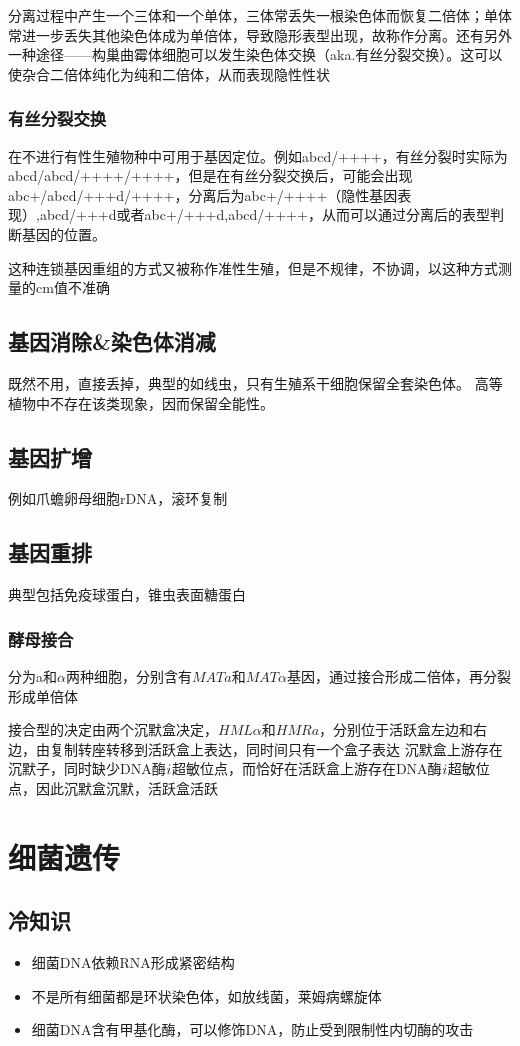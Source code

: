 \documentclass[a4paper, 12pt]{report}
\begin{document}
  分离过程中产生一个三体和一个单体，三体常丢失一根染色体而恢复二倍体；单体常进一步丢失其他染色体成为单倍体，导致隐形表型出现，故称作分离。还有另外一种途径——构巢曲霉体细胞可以发生染色体交换（aka.有丝分裂交换）。这可以使杂合二倍体纯化为纯和二倍体，从而表现隐性性状
  \subsection{有丝分裂交换}
  在不进行有性生殖物种中可用于基因定位。例如abcd/++++，有丝分裂时实际为abcd/abcd/++++/++++，但是在有丝分裂交换后，可能会出现abc+/abcd/+++d/++++，分离后为abc+/++++（隐性基因表现）,abcd/+++d或者abc+/+++d,abcd/++++，从而可以通过分离后的表型判断基因的位置。

  这种连锁基因重组的方式又被称作准性生殖，但是不规律，不协调，以这种方式测量的cm值不准确
  \section{基因消除\&染色体消减}
  既然不用，直接丢掉，典型的如线虫，只有生殖系干细胞保留全套染色体。
  高等植物中不存在该类现象，因而保留全能性。
  \section{基因扩增}
  例如爪蟾卵母细胞rDNA，滚环复制
  \section{基因重排}
  典型包括免疫球蛋白，锥虫表面糖蛋白
  \subsection{酵母接合}
  分为a和\(\alpha\)两种细胞，分别含有\(MATa\)和\(MAT\alpha\)基因，通过接合形成二倍体，再分裂形成单倍体
  
  接合型的决定由两个沉默盒决定，\(HML\alpha\)和\(HMRa\)，分别位于活跃盒左边和右边，由复制转座转移到活跃盒上表达，同时间只有一个盒子表达
  沉默盒上游存在沉默子，同时缺少DNA酶\(\romannumeral1\)超敏位点，而恰好在活跃盒上游存在DNA酶\(\romannumeral1\)超敏位点，因此沉默盒沉默，活跃盒活跃
  \chapter{细菌遗传}
  \section{冷知识}
  \begin{itemize}
    \item 细菌DNA依赖RNA形成紧密结构
    \item 不是所有细菌都是环状染色体，如放线菌，莱姆病螺旋体
    \item 细菌DNA含有甲基化酶，可以修饰DNA，防止受到限制性内切酶的攻击
  \end{itemize}
\end{document}
